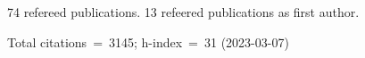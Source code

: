 74 refereed publications. 13 refeered publications as first author.

Total citations~=~3145; h-index~=~31 (2023-03-07)